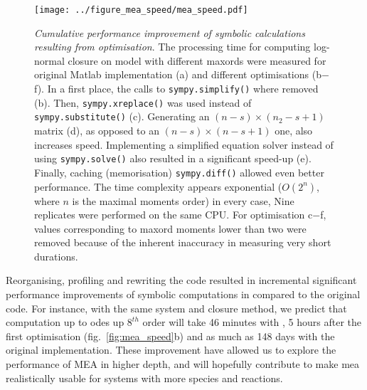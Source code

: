 \begin{figure}[tbh]

\texttt{[image: ../figure\_mea\_speed/mea\_speed.pdf]}
\caption{\emph{Cumulative performance improvement of symbolic 
calculations resulting from optimisation}.
The processing time for computing log-normal closure on \pft{} model with different \gls{maxord}s were measured for original Matlab implementation (a) and different optimisations (b$-$f).
In a first place, the calls to \texttt{sympy.simplify()} where  removed (b). 
Then, \texttt{sympy.xreplace()} was used instead of \texttt{sympy.substitute()} (c). 
Generating an $(n-s) \times (n_2-s + 1)$  matrix (d), as opposed to an $(n-s) \times (n-s + 1)$ one, also increases speed.
Implementing a simplified equation solver instead of using \texttt{sympy.solve()} also resulted in a significant speed-up (e). 
Finally, caching (memorisation) \texttt{sympy.diff()} allowed even better performance.
The time complexity appears exponential ($O(2^n)$,  where $n$ is the maximal moments order) in every case, 
Nine replicates were performed on the same CPU. 
For optimisation c$-$f, values corresponding to \gls{maxord} moments lower than two were removed because of the inherent inaccuracy in measuring very short durations.}
\label{fig:mea_speed}
\end{figure}


Reorganising, profiling and rewriting the code resulted in incremental significant performance improvements of symbolic computations in \means{} compared to the original \mat{} code.
For instance, with the same \pft{} system and closure method, 
we predict that computation up to \gls{ode}s up $8^{th}$ order will take 46 minutes with \means{}, 5 hours after the first optimisation (fig.~\autoref{fig:mea_speed}b) and as much as 148 days with the original implementation.
These improvement have allowed us to explore the performance of MEA in higher depth, and will hopefully contribute to make \gls{mea} realistically usable for systems with more species and reactions.

